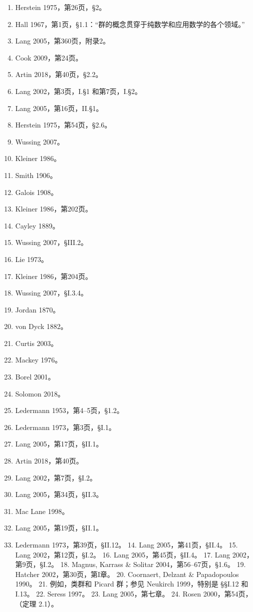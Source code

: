 \begin{enumerate}
\item Herstein 1975，第26页，§2。  
\item Hall 1967，第1页，§1.1：“群的概念贯穿于纯数学和应用数学的各个领域。”  
\item Lang 2005，第360页，附录2。  
\item Cook 2009，第24页。  
\item Artin 2018，第40页，§2.2。  
\item Lang 2002，第3页，I.§1 和第7页，I.§2。  
\item Lang 2005，第16页，II.§1。  
\item Herstein 1975，第54页，§2.6。  
\item Wussing 2007。  
\item Kleiner 1986。  
\item Smith 1906。  
\item Galois 1908。  
\item Kleiner 1986，第202页。  
\item Cayley 1889。  
\item Wussing 2007，§III.2。  
\item Lie 1973。  
\item Kleiner 1986，第204页。  
\item Wussing 2007，§I.3.4。  
\item Jordan 1870。  
\item von Dyck 1882。

 
\item Curtis 2003。  
\item Mackey 1976。  
\item Borel 2001。  
\item Solomon 2018。  
\item Ledermann 1953，第4–5页，§1.2。  
\item Ledermann 1973，第3页，§I.1。  
\item Lang 2005，第17页，§II.1。  
\item Artin 2018，第40页。  
\item Lang 2002，第7页，§I.2。  
\item Lang 2005，第34页，§II.3。  
\item Mac Lane 1998。  
\item Lang 2005，第19页，§II.1。  
\item Ledermann 1973，第39页，§II.12。  
14. Lang 2005，第41页，§II.4。  
15. Lang 2002，第12页，§I.2。  
16. Lang 2005，第45页，§II.4。  
17. Lang 2002，第9页，§I.2。  
18. Magnus, Karrass & Solitar 2004，第56–67页，§1.6。  
19. Hatcher 2002，第30页，第I章。  
20. Coornaert, Delzant & Papadopoulos 1990。  
21. 例如，类群和 Picard 群；参见 Neukirch 1999，特别是 §§I.12 和 I.13。  
22. Seress 1997。  
23. Lang 2005，第七章。  
24. Rosen 2000，第54页，（定理 2.1）。
\end{enumerate}